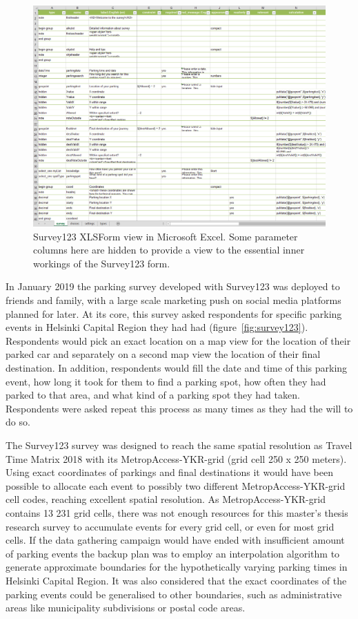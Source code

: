 \begin{figure}[H]%
    \includegraphics[width=\textwidth]{images/survey123_xlsform.png}
    \caption[Survey123 XLSForm view]{Survey123 XLSForm view in Microsoft Excel. Some parameter columns here are hidden to provide a view to the essential inner workings of the Survey123 form.}%
    \label{fig:survey123_xlsform}%
\end{figure}

In January 2019 the parking survey developed with Survey123 was deployed to friends and family, with a large scale marketing push on social media platforms planned for later. At its core, this survey asked respondents for specific parking events in Helsinki Capital Region they had had (figure~\ref{fig:survey123}). Respondents would pick an exact location on a map view for the location of their parked car and separately on a second map view the location of their final destination. In addition, respondents would fill the date and time of this parking event, how long it took for them to find a parking spot, how often they had parked to that area, and what kind of a parking spot they had taken. Respondents were asked repeat this process as many times as they had the will to do so.

The Survey123 survey was designed to reach the same spatial resolution as Travel Time Matrix 2018 with its MetropAccess-YKR-grid (grid cell 250 x 250 meters). Using exact coordinates of parkings and final destinations it would have been possible to allocate each event to possibly two different MetropAccess-YKR-grid cell codes, reaching excellent spatial resolution. As MetropAccess-YKR-grid contains 13 231 grid cells, there was not enough resources for this master's thesis research survey to accumulate events for every grid cell, or even for most grid cells. If the data gathering campaign would have ended with insufficient amount of parking events the backup plan was to employ an interpolation algorithm to generate approximate boundaries for the hypothetically varying parking times in Helsinki Capital Region. It was also considered that the exact coordinates of the parking events could be generalised to other boundaries, such as administrative areas like municipality subdivisions or postal code areas. 

